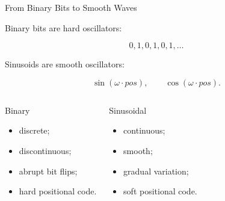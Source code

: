 \documentclass[aspectratio=169]{beamer}
\begin{document}
%
%
\begin{frame}{From Binary Bits to Smooth Waves}

Binary bits are hard oscillators:

\[
0,1,0,1,0,1,\ldots
\]

Sinusoids are smooth oscillators:

\[
\sin(\omega \cdot pos),
\qquad
\cos(\omega \cdot pos).
\]

\begin{columns}[T]


\begin{block}{Binary}
\begin{itemize}
    \item discrete;
    \item discontinuous;
    \item abrupt bit flips;
    \item hard positional code.
\end{itemize}
\end{block}


\begin{block}{Sinusoidal}
\begin{itemize}
    \item continuous;
    \item smooth;
    \item gradual variation;
    \item soft positional code.
\end{itemize}
\end{block}

\end{columns}


\end{frame}
%
%
\end{document}
